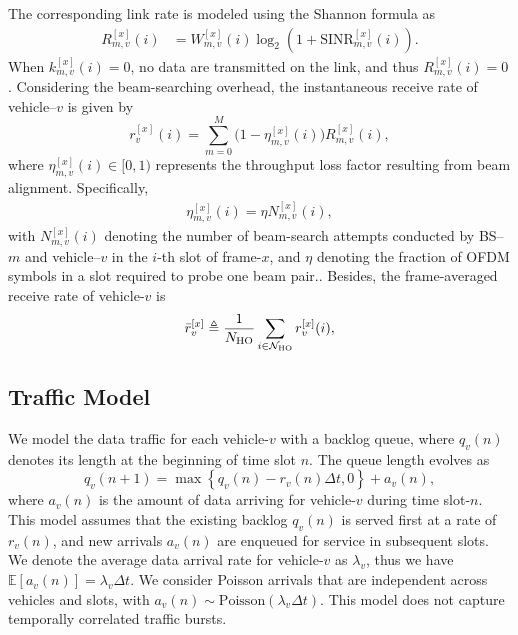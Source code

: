 \documentclass[10pt,journal,letterpaper]{IEEEtran}
\newcommand{\rev}[1]{\textcolor{revisioncolor}{{}#1}}
\newcommand{\omitted}[1]{}
\theoremstyle{remark}
\begin{document}
\omitted{}\rev{The corresponding link rate is modeled using the Shannon formula as}
\begin{align}
    R_{m,v}^{[x]}(i) & = W_{m,v}^{[x]}(i) \log_2 \left( 1 + \mathrm{SINR}_{m,v}^{[x]}(i) \right).
    \label{eq:instantaneous link achievable rate}
\end{align}
\rev{When $k_{m,v}^{[x]}(i)=0$, no data are transmitted on the link, and thus $R_{m,v}^{[x]}(i)=0$.}
Considering the beam-searching overhead, the instantaneous receive rate of vehicle–$v$ is given by
\begin{equation}
    r_{v}^{[x]}(i) = \sum_{m=0}^M \bigl(1-\eta_{m,v}^{[x]}(i) \bigl)R_{m,v}^{[x]}(i),
    \label{eq:instantaneous veh receive rate}
\end{equation}
where $\eta_{m,v}^{[x]}(i) \in [0,1)$ represents the throughput loss factor resulting from beam alignment. Specifically,
\begin{align}
\eta_{m,v}^{[x]}(i) = \eta N_{m,v}^{[x]}(i),
\end{align}
with $N_{m,v}^{[x]}(i)$ denoting the number of beam-search attempts conducted by BS–$m$ and vehicle–$v$ in the $i$-th slot of frame-$x$, and $\eta$ \omitted{}\rev{denoting the fraction of OFDM symbols in a slot required to probe one beam pair.}.
Besides, the frame-averaged receive rate of vehicle-$v$ is 
\begin{equation}
    \bar{r}_v^{[x]} \triangleq  \frac{1}{N_{\rm HO}}\sum_{ i \in \mathcal{N}_{\rm HO}}r_{v}^{[x]}(i),
    \label{eq:frame-averaged veh receive rate}
\end{equation}


\subsection{Traffic Model}
We model the data traffic for each vehicle-$v$ with a backlog queue, where $q_v(n)$ denotes its length at the beginning of time slot $n$. The queue length evolves as
\begin{equation}
    q_v(n+1) = \max \left\{ q_v(n) - r_v(n) \Delta t, 0 \right\} + a_v(n),
    \label{eq: queue update}
\end{equation}
where $a_v(n)$ is the amount of data arriving for vehicle-$v$ during time slot-$n$.
This model assumes that the existing backlog $q_v(n)$ is served first at a rate of $r_v(n)$, and new arrivals $a_v(n)$ are enqueued for service in subsequent slots. 
We denote the average data arrival rate for vehicle-$v$ as $\lambda_v$, thus we have $\mathbb{E}\left[ a_v(n) \right] = \lambda_v \Delta t$.
\rev{We consider Poisson arrivals that are independent across vehicles and slots, with $a_v(n)\sim\mathrm{Poisson} (\lambda_v\Delta t)$. This model does not capture temporally correlated traffic bursts.}
\end{document}

